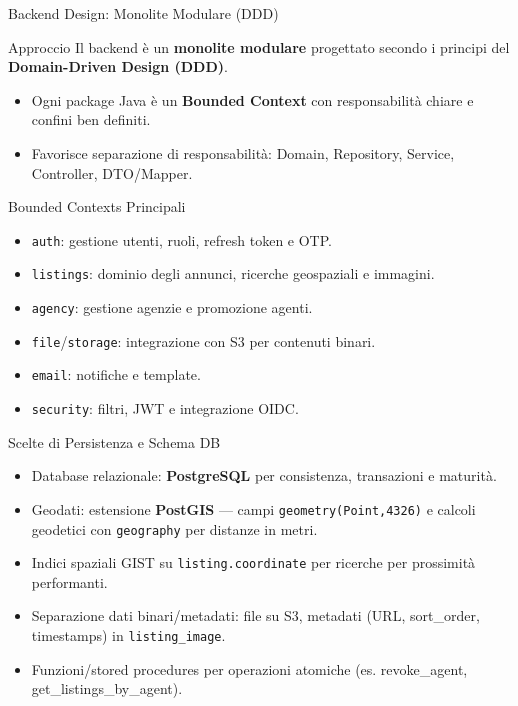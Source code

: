 \documentclass[10pt]{beamer}
\begin{document}
\begin{frame}{Backend Design: Monolite Modulare (DDD)}
    \begin{block}{Approccio}
        Il backend è un \textbf{monolite modulare} progettato secondo i principi del \textbf{Domain-Driven Design (DDD)}.
        \begin{itemize}
            \item Ogni package Java è un \textbf{Bounded Context} con responsabilità chiare e confini ben definiti.
            \item Favorisce separazione di responsabilità: Domain, Repository, Service, Controller, DTO/Mapper.
        \end{itemize}
    \end{block}
    \begin{block}{Bounded Contexts Principali}
        \begin{itemize}
            \item \texttt{auth}: gestione utenti, ruoli, refresh token e OTP.
            \item \texttt{listings}: dominio degli annunci, ricerche geospaziali e immagini.
            \item \texttt{agency}: gestione agenzie e promozione agenti.
            \item \texttt{file}/\texttt{storage}: integrazione con S3 per contenuti binari.
            \item \texttt{email}: notifiche e template.
            \item \texttt{security}: filtri, JWT e integrazione OIDC.
        \end{itemize}
    \end{block}
\end{frame}

\begin{frame}{Scelte di Persistenza e Schema DB}
    \begin{itemize}
        \item Database relazionale: \textbf{PostgreSQL} per consistenza, transazioni e maturità.
        \item Geodati: estensione \textbf{PostGIS} — campi \texttt{geometry(Point,4326)} e calcoli geodetici con \texttt{geography} per distanze in metri.
        \item Indici spaziali GIST su \texttt{listing.coordinate} per ricerche per prossimità performanti.
        \item Separazione dati binari/metadati: file su S3, metadati (URL, sort\_order, timestamps) in \texttt{listing\_image}.
        \item Funzioni/stored procedures per operazioni atomiche (es. revoke\_agent, get\_listings\_by\_agent).
    \end{itemize}
\end{frame}
\end{document}

